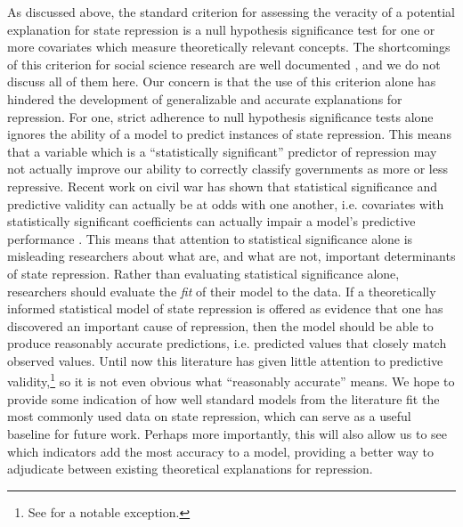 \documentclass[11pt]{article}
\begin{document}
As discussed above, the standard criterion for assessing the veracity of a potential explanation for state repression is a null hypothesis significance test for one or more covariates which measure theoretically relevant concepts. The shortcomings of this criterion for social science research are well documented \citep[See, e.g.][]{Gill1999}, and we do not discuss all of them here. Our concern is that the use of this criterion alone has hindered the development of generalizable and accurate explanations for repression. For one, strict adherence to null hypothesis significance tests alone ignores the ability of a model to predict instances of state repression. This means that a variable which is a ``statistically significant'' predictor of repression may not actually improve our ability to correctly classify governments as more or less repressive. 
Recent work on civil war has shown that statistical significance and predictive validity can actually be at odds with one another, i.e. covariates with statistically significant coefficients can actually impair a model's predictive performance \citep{Wardetal2010}. This means that attention to statistical significance alone is misleading researchers about what are, and what are not, important determinants of state repression. Rather than evaluating statistical significance alone, researchers should evaluate the {\em fit} of their model to the data. If a theoretically informed statistical model of state repression is offered as evidence that one has discovered an important cause of repression, then the model should be able to produce reasonably accurate predictions, i.e. predicted values that closely match observed values. Until now this literature has given little attention to predictive validity,\footnote{See \citet{PoeRostCarey2006} for a notable exception.} so it is not even obvious what ``reasonably accurate'' means. We hope to provide some indication of how well standard models from the literature fit the most commonly used data on state repression, which can serve as a useful baseline for future work. Perhaps more importantly, this will also allow us to see which indicators add the most accuracy to a model, providing a better way to adjudicate between existing theoretical explanations for repression.
\end{document}
